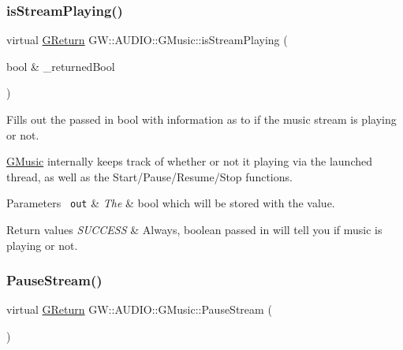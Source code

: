 \subsubsection{\texorpdfstring{isStreamPlaying()}{isStreamPlaying()}}
{\footnotesize\ttfamily virtual \mbox{\hyperlink{namespaceGW_a67a839e3df7ea8a5c5686613a7a3de21}{G\+Return}} G\+W\+::\+A\+U\+D\+I\+O\+::\+G\+Music\+::is\+Stream\+Playing (\begin{DoxyParamCaption}\item[{bool \&}]{\+\_\+returned\+Bool }\end{DoxyParamCaption})\hspace{0.3cm}{\ttfamily [pure virtual]}}



Fills out the passed in bool with information as to if the music stream is playing or not. 

\mbox{\hyperlink{classGW_1_1AUDIO_1_1GMusic}{G\+Music}} internally keeps track of whether or not it playing via the launched thread, as well as the Start/\+Pause/\+Resume/\+Stop functions.


\begin{DoxyParams}[1]{Parameters}
\mbox{\texttt{ out}}  & {\em The} & bool which will be stored with the value.\\
\hline
\end{DoxyParams}

\begin{DoxyRetVals}{Return values}
{\em S\+U\+C\+C\+E\+SS} & Always, boolean passed in will tell you if music is playing or not. \\
\hline
\end{DoxyRetVals}
\mbox{\label{classGW_1_1AUDIO_1_1GMusic_a6a7a4efcf2d54bcf53429cedd7687e73}} 
\subsubsection{\texorpdfstring{PauseStream()}{PauseStream()}}
{\footnotesize\ttfamily virtual \mbox{\hyperlink{namespaceGW_a67a839e3df7ea8a5c5686613a7a3de21}{G\+Return}} G\+W\+::\+A\+U\+D\+I\+O\+::\+G\+Music\+::\+Pause\+Stream (\begin{DoxyParamCaption}{ }\end{DoxyParamCaption})\hspace{0.3cm}{\ttfamily [pure virtual]}}



